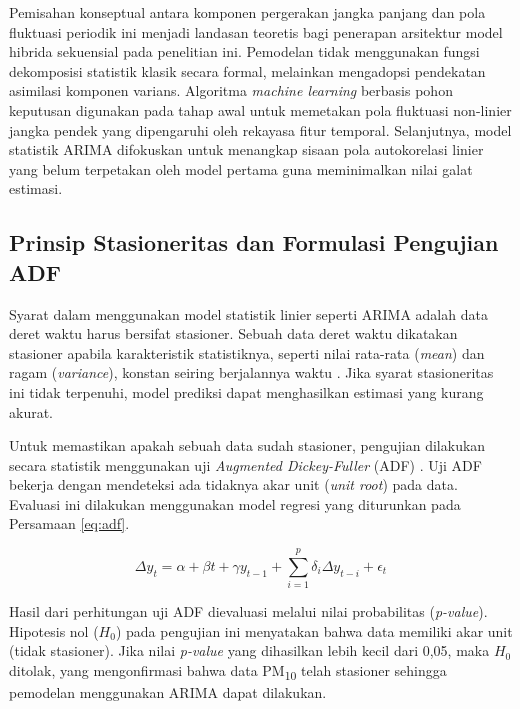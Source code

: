 Pemisahan konseptual antara komponen pergerakan jangka panjang dan pola fluktuasi periodik ini menjadi landasan teoretis bagi penerapan arsitektur model hibrida sekuensial pada penelitian ini. Pemodelan tidak menggunakan fungsi dekomposisi statistik klasik secara formal, melainkan mengadopsi pendekatan asimilasi komponen varians. Algoritma \textit{machine learning} berbasis pohon keputusan digunakan pada tahap awal untuk memetakan pola fluktuasi non-linier jangka pendek yang dipengaruhi oleh rekayasa fitur temporal. Selanjutnya, model statistik ARIMA difokuskan untuk menangkap sisaan pola autokorelasi linier yang belum terpetakan oleh model pertama guna meminimalkan nilai galat estimasi.

\subsection{Prinsip Stasioneritas dan Formulasi Pengujian ADF}

Syarat dalam menggunakan model statistik linier seperti ARIMA adalah data deret waktu harus bersifat stasioner. Sebuah data deret waktu dikatakan stasioner apabila karakteristik statistiknya, seperti nilai rata-rata (\textit{mean}) dan ragam (\textit{variance}), konstan seiring berjalannya waktu \autocite{minitab2025adf}. Jika syarat stasioneritas ini tidak terpenuhi, model prediksi dapat menghasilkan estimasi yang kurang akurat.

Untuk memastikan apakah sebuah data sudah stasioner, pengujian dilakukan secara statistik menggunakan uji \textit{Augmented Dickey-Fuller} (ADF) \autocite{vasconcelos2025stationarity}. Uji ADF bekerja dengan mendeteksi ada tidaknya akar unit (\textit{unit root}) pada data. Evaluasi ini dilakukan menggunakan model regresi yang diturunkan pada Persamaan \ref{eq:adf}.

\begin{equation}
\Delta y_t = \alpha + \beta t + \gamma y_{t-1} + \sum_{i=1}^{p} \delta_i \Delta y_{t-i} + \epsilon_t
\label{eq:adf}
\end{equation}

\newpage

Hasil dari perhitungan uji ADF dievaluasi melalui nilai probabilitas (\textit{p-value}). Hipotesis nol ($H_0$) pada pengujian ini menyatakan bahwa data memiliki akar unit (tidak stasioner). Jika nilai \textit{p-value} yang dihasilkan lebih kecil dari 0,05, maka $H_0$ ditolak, yang mengonfirmasi bahwa data PM\textsubscript{10} telah stasioner sehingga pemodelan menggunakan ARIMA dapat dilakukan.

